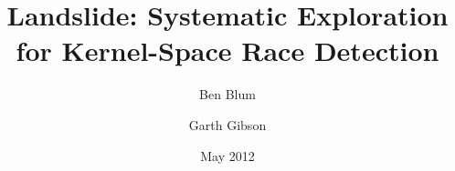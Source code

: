 \documentclass{llncs}
\begin{document}

\title{\bf Landslide: Systematic Exploration for Kernel-Space Race Detection}
\author{Ben Blum \and Garth Gibson}
\date{May 2012}



\maketitle

\newcommand\true{\;\textit{true}}
\newcommand\false{\;\textit{false}}

\newcommand\alpher\alpha
\newcommand\beter\beta
\newcommand\gammer\gamma
\newcommand\delter\delta
\newcommand\zeter\zeta
\newcommand\Sigmer\Sigma

\newcommand\NN{\mathbb{N}}
\newcommand\QQ{\mathbb{Q}}
\newcommand\RR{\mathbb{R}}
\newcommand\ZZ{\mathbb{Z}}

\setcounter{changebargrey}{35}
\newcommand\revision[1]{#1}
\end{document}
